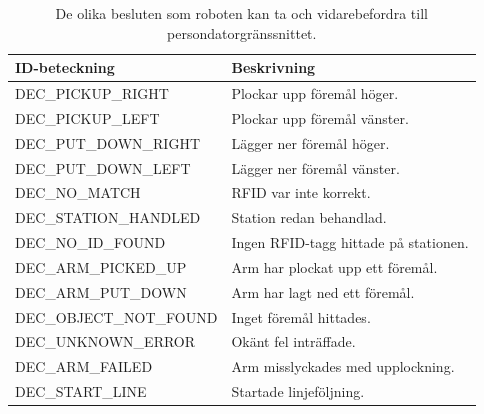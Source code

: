 \begin{table}[H]
\label{decision}
\begin{tabularx}{\textwidth}{|l|X|}
\hline
\textbf{ID-beteckning} & \textbf{Beskrivning} \\ \hline
DEC\_PICKUP\_RIGHT & Plockar upp föremål höger. \\ \hline
DEC\_PICKUP\_LEFT & Plockar upp föremål vänster. \\ \hline
DEC\_PUT\_DOWN\_RIGHT & Lägger ner föremål höger. \\ \hline
DEC\_PUT\_DOWN\_LEFT & Lägger ner föremål vänster.  \\ \hline
DEC\_NO\_MATCH & RFID var inte korrekt.  \\ \hline
DEC\_STATION\_HANDLED & Station redan behandlad.  \\ \hline
DEC\_NO\_ID\_FOUND & Ingen RFID-tagg hittade på stationen.  \\ \hline
DEC\_ARM\_PICKED\_UP & Arm har plockat upp ett föremål. \\ \hline
DEC\_ARM\_PUT\_DOWN & Arm har lagt ned ett föremål. \\ \hline
DEC\_OBJECT\_NOT\_FOUND & Inget föremål hittades. \\ \hline
DEC\_UNKNOWN\_ERROR & Okänt fel inträffade. \\ \hline
DEC\_ARM\_FAILED & Arm misslyckades med upplockning. \\ \hline
DEC\_START\_LINE & Startade linjeföljning. \\ \hline
\end{tabularx}
\caption{De olika besluten som roboten kan ta och vidarebefordra till persondatorgränssnittet.}
\end{table}
